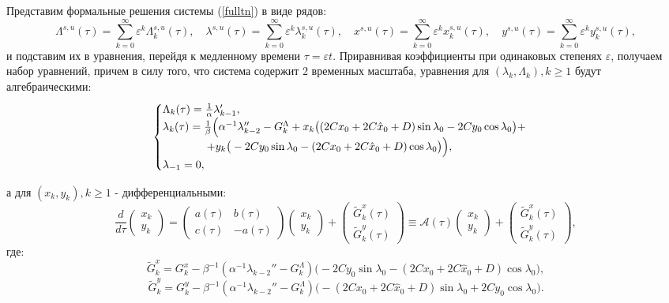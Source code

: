 Представим формальные решения системы (\ref{fulltn}) в виде рядов:
\begingroup
\small
\begin{equation}
\Lambda^{s,u}(\tau) = \sum_{k=0}^\infty \varepsilon^k \Lambda^{s,u}_k(\tau),\quad
\lambda^{s,u}(\tau) = \sum_{k=0}^\infty \varepsilon^k \lambda^{s,u}_k(\tau),\quad
x^{s,u}(\tau) =       \sum_{k=0}^\infty \varepsilon^k x^{s,u}_k(\tau),\quad
y^{s,u}(\tau) =       \sum_{k=0}^\infty \varepsilon^k y^{s,u}_k(\tau),
\label{predst}
\end{equation}
\endgroup
и подставим их в уравнения, перейдя к медленному времени $\tau=\varepsilon t$.
    Приравнивая коэффициенты при одинаковых степенях $\varepsilon$, получаем набор уравнений, причем в силу того, что система содержит 2 временных масштаба, уравнения для $(\lambda_k, \Lambda_k), k \ge 1$ будут алгебраическими:
\begin{equation}
    \mathsmaller{
    \begin{cases}
        \Lambda_k(\tau) = \frac{1}{\alpha} \lambda_{k-1}', \\
        
        \lambda_k(\tau) = \frac1\beta \Big( \alpha^{-1} \lambda_{k-2}'' - G_k^\Lambda + x_k \big( (2Cx_0+2C \hat x_0+D) \sin\lambda_0 - 2Cy_0 \cos\lambda_0 \big) + \\ \qquad \qquad + y_k \big( -2Cy_0 \sin\lambda_0 - (2Cx_0+2C \hat x_0+D) \cos\lambda_0 \big) \Big),\\
        \lambda_{-1}=0,
    \end{cases}
    }
\end{equation}

а для $(x_k,y_k), k \ge 1$ - дифференциальными:
\begin{equation}
\frac{d}{d\tau} \begin{pmatrix} x_k \\ y_k \end{pmatrix} = \begin{pmatrix} a(\tau) & b(\tau)\\ c(\tau) & -a(\tau) \end{pmatrix} \begin{pmatrix} x_k \\ y_k \end{pmatrix} + \begin{pmatrix} \tilde G_k^x(\tau) \\ \tilde G_k^y(\tau) \end{pmatrix} \equiv \mathcal{A}(\tau) \begin{pmatrix} x_k \\ y_k \end{pmatrix} + \begin{pmatrix} \tilde G_k^x(\tau) \\ \tilde G_k^y(\tau) \end{pmatrix},
\label{xy_eq}
\end{equation}
где:
$$ \tilde G_k^x = G_k^x - \beta^{-1} (\alpha^{-1} \lambda_{k-2}'' - G_k^\Lambda) \big( -2Cy_0 \sin\lambda_0 - (2Cx_0+2C \hat x_0+D) \cos\lambda_0 \big), $$
$$ \tilde G_k^y = G_k^y - \beta^{-1} (\alpha^{-1} \lambda_{k-2}'' - G_k^\Lambda) \big( -(2Cx_0+2C \hat x_0+D) \sin\lambda_0 + 2Cy_0 \cos\lambda_0 \big). $$


